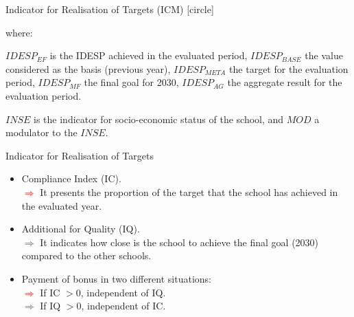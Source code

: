 \documentclass{beamer}
\begin{document}
\begin{frame}[label=ICM]{Indicator for Realisation of Targets (ICM)}
\vspace{-5pt}
[circle]
\begin{flushleft} \hspace{9pt}
{\scriptsize where:}
\end{flushleft}
\vspace{-5pt}
\begin{itemize}
{\tiny\item $IDESP_{EF}$ is the IDESP achieved in the evaluated period, $IDESP_{BASE}$ the value considered as the basis (previous year), $IDESP_{META}$ the target for the evaluation period, $IDESP_{MF}$ the final goal for 2030, $IDESP_{AG}$ the aggregate result for the evaluation period.}
\vspace{-5pt}
{\tiny\item $INSE$ is the indicator for socio-economic status of the school, and $MOD$ a modulator to the $INSE$.}
\end{itemize}

\vspace{-2pt}
\begin{block}{\centering Indicator for Realisation of Targets}
\begin{itemize}
\item [\sbt] \scriptsize Compliance Index (IC).
\\ \tiny\textcolor{red}{$\Longrightarrow$} It presents the proportion of the target that the school has achieved in the evaluated year.
\item [\sbt] \scriptsize Additional for Quality (IQ).
\\ \tiny\textcolor{red}{$\Longrightarrow$} It indicates how close is the school to achieve the final goal (2030) compared to the other schools.
\item [\sbt] \scriptsize Payment of bonus in two different situations:
\\ \tiny\textcolor{red}{$\Longrightarrow$} If IC $>0$, independent of IQ.
\\ \tiny\textcolor{red}{$\Longrightarrow$} If IQ $>0$, independent of IC.
\end{itemize}
\vspace{-5pt}
\end{block}
\end{frame}
\end{document}
